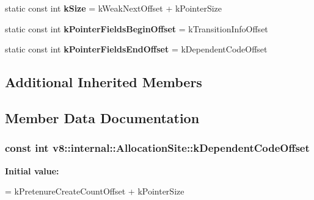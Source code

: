 \begin{DoxyCompactItemize}
\item 
\hypertarget{classv8_1_1internal_1_1_allocation_site_a8563fdab6231c9e2d1346a3d2a726d9c}{}static const int {\bfseries k\+Size} = k\+Weak\+Next\+Offset + k\+Pointer\+Size\label{classv8_1_1internal_1_1_allocation_site_a8563fdab6231c9e2d1346a3d2a726d9c}

\item 
\hypertarget{classv8_1_1internal_1_1_allocation_site_a0a718e12a1ec05d53dde6dd61835db66}{}static const int {\bfseries k\+Pointer\+Fields\+Begin\+Offset} = k\+Transition\+Info\+Offset\label{classv8_1_1internal_1_1_allocation_site_a0a718e12a1ec05d53dde6dd61835db66}

\item 
\hypertarget{classv8_1_1internal_1_1_allocation_site_a8f06e59d25cc4c6946f902d3c79ebbc5}{}static const int {\bfseries k\+Pointer\+Fields\+End\+Offset} = k\+Dependent\+Code\+Offset\label{classv8_1_1internal_1_1_allocation_site_a8f06e59d25cc4c6946f902d3c79ebbc5}

\end{DoxyCompactItemize}
\subsection*{Additional Inherited Members}


\subsection{Member Data Documentation}
\hypertarget{classv8_1_1internal_1_1_allocation_site_a4c5455657e57dde03629911e0c1fba19}{}
\subsubsection[{k\+Dependent\+Code\+Offset}]{\setlength{\rightskip}{0pt plus 5cm}const int v8\+::internal\+::\+Allocation\+Site\+::k\+Dependent\+Code\+Offset\hspace{0.3cm}{\ttfamily [static]}}\label{classv8_1_1internal_1_1_allocation_site_a4c5455657e57dde03629911e0c1fba19}
{\bfseries Initial value\+:}
\begin{DoxyCode}
=
      kPretenureCreateCountOffset + kPointerSize
\end{DoxyCode}
\hypertarget{classv8_1_1internal_1_1_allocation_site_ad4371d69986a9a4dad979104ed388710}{}
